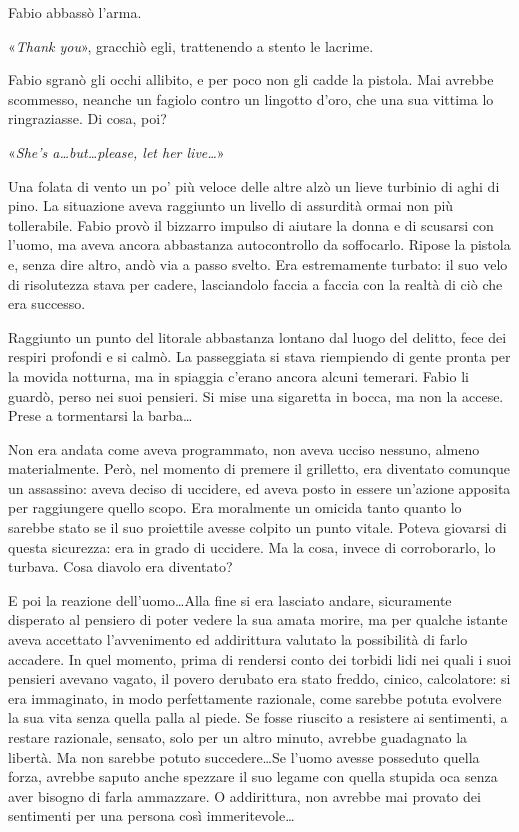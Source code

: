 Fabio abbassò l'arma.

«\textit{Thank you}», gracchiò egli, trattenendo a stento le lacrime.

Fabio sgranò gli occhi allibito, e per poco non gli cadde la pistola. Mai avrebbe scommesso, neanche un fagiolo contro un lingotto d'oro, che una sua vittima lo ringraziasse. Di cosa, poi?

«\textit{She's a\ldots but\ldots please, let her live\ldots}»

Una folata di vento un po' più veloce delle altre alzò un lieve turbinio di aghi di pino. La situazione aveva raggiunto un livello di assurdità ormai non più tollerabile. Fabio provò il bizzarro impulso di aiutare la donna e di scusarsi con l'uomo, ma aveva ancora abbastanza autocontrollo da soffocarlo. Ripose la pistola e, senza dire altro, andò via a passo svelto. Era estremamente turbato: il suo velo di risolutezza stava per cadere, lasciandolo faccia a faccia con la realtà di ciò che era successo.

Raggiunto un punto del litorale abbastanza lontano dal luogo del delitto, fece dei respiri profondi e si calmò. La passeggiata si stava riempiendo di gente pronta per la movida notturna, ma in spiaggia c'erano ancora alcuni temerari. Fabio li guardò, perso nei suoi pensieri. Si mise una sigaretta in bocca, ma non la accese. Prese a tormentarsi la barba\ldots

Non era andata come aveva programmato, non aveva ucciso nessuno, almeno materialmente. Però, nel momento di premere il grilletto, era diventato comunque un assassino: aveva deciso di uccidere, ed aveva posto in essere un'azione apposita per raggiungere quello scopo. Era moralmente un omicida tanto quanto lo sarebbe stato se il suo proiettile avesse colpito un punto vitale. Poteva giovarsi di questa sicurezza: era in grado di uccidere. Ma la cosa, invece di corroborarlo, lo turbava. Cosa diavolo era diventato?

E poi la reazione dell'uomo\ldots Alla fine si era lasciato andare, sicuramente disperato al pensiero di poter vedere la sua amata morire, ma per qualche istante aveva accettato l'avvenimento ed addirittura valutato la possibilità di farlo accadere. In quel momento, prima di rendersi conto dei torbidi lidi nei quali i suoi pensieri avevano vagato, il povero derubato era stato freddo, cinico, calcolatore: si era immaginato, in modo perfettamente razionale, come sarebbe potuta evolvere la sua vita senza quella palla al piede. Se fosse riuscito a resistere ai sentimenti, a restare razionale, sensato, solo per un altro minuto, avrebbe guadagnato la libertà. Ma non sarebbe potuto succedere\ldots Se l'uomo avesse posseduto quella forza, avrebbe saputo anche spezzare il suo legame con quella stupida oca senza aver bisogno di farla ammazzare. O addirittura, non avrebbe mai provato dei sentimenti per una persona così immeritevole\ldots

